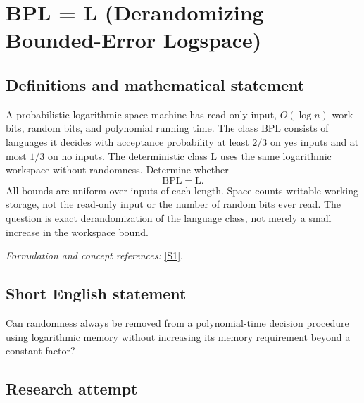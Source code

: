 \documentclass[11pt,a4paper]{article}
\newcommand{\sref}[2]{\hyperlink{source:#1:#2}{[S#2]}}
\newif\ifshowcatalogue
\newcommand{\cataloguescope}[1]{\ifshowcatalogue
 \paragraph{Exact scope in the supplied catalogue.}
 \begin{quote}\small #1\end{quote}\fi}
\numberwithin{equation}{section}
\begin{document}
\setcounter{section}{162}
\clearpage
\section{\texorpdfstring{BPL = L (Derandomizing Bounded-Error Logspace)}{BPL = L (Derandomizing Bounded-Error Logspace)}}\label{163}
\subsection{Definitions and mathematical statement}
A probabilistic logarithmic-space machine has read-only input, $O(\log n)$ work bits, random bits, and polynomial running time. The class $\mathrm{BPL}$ consists of languages it decides with acceptance probability at least $2/3$ on yes inputs and at most $1/3$ on no inputs. The deterministic class $\mathrm L$ uses the same logarithmic workspace without randomness. Determine whether
\[
 \mathrm{BPL}=\mathrm L.
\]
All bounds are uniform over inputs of each length. Space counts writable working storage, not the read-only input or the number of random bits ever read. The question is exact derandomization of the language class, not merely a small increase in the workspace bound.
\par\smallskip\textit{Formulation and concept references:} \sref{163}{1}.
\cataloguescope{Prove or disprove that every language decidable by a probabilistic Turing machine using O(log n) workspace, polynomial time, and bounded two-sided error is decidable by a deterministic Turing machine using O(log n) workspace.}
\subsection{Short English statement}
Can randomness always be removed from a polynomial-time decision procedure using logarithmic memory without increasing its memory requirement beyond a constant factor?
\subsection{Research attempt}
\end{document}
